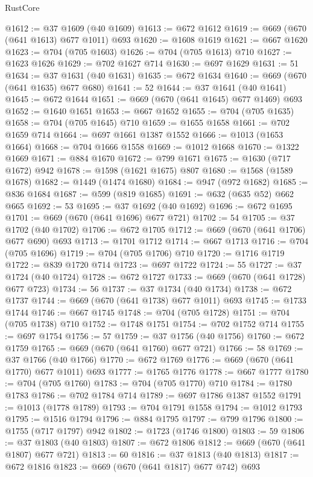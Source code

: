 \begin{lexlean}{RustCore}
\begin{coremodule}
@1612 := @37 @1609 (@40 @1609)
@1613 := @672 @1612
@1619 := @669 (@670 (@641 @1613) @677 @1011) @693
@1620 := @1608 @1619
@1621 := @667 @1620
@1623 := @704 (@705 @1603)
@1626 := @704 (@705 @1613) @710
@1627 := @1623 @1626
@1629 := @702 @1627 @714
@1630 := @697 @1629
@1631 := 51
@1634 := @37 @1631 (@40 @1631)
@1635 := @672 @1634
@1640 := @669 (@670 (@641 @1635) @677 @680)
@1641 := 52
@1644 := @37 @1641 (@40 @1641)
@1645 := @672 @1644
@1651 := @669 (@670 (@641 @1645) @677 @1469) @693
@1652 := @1640 @1651
@1653 := @667 @1652
@1655 := @704 (@705 @1635)
@1658 := @704 (@705 @1645) @710
@1659 := @1655 @1658
@1661 := @702 @1659 @714
@1664 := @697 @1661 @1387 @1552
@1666 := @1013 (@1653 @1664)
@1668 := @704 @1666 @1558
@1669 := @1012 @1668
@1670 := @1322 @1669
@1671 := @884 @1670
@1672 := @799 @1671
@1675 := @1630 (@717 @1672) @942
@1678 := @1598 (@1621 @1675) @807
@1680 := @1568 (@1589 @1678)
@1682 := @1449 (@1474 @1680)
@1684 := @947 (@972 @1682)
@1685 := @836 @1684
@1687 := @599 (@819 @1685)
@1691 := @632 (@635 @52) @662 @665
@1692 := 53
@1695 := @37 @1692 (@40 @1692)
@1696 := @672 @1695
@1701 := @669 (@670 (@641 @1696) @677 @721)
@1702 := 54
@1705 := @37 @1702 (@40 @1702)
@1706 := @672 @1705
@1712 := @669 (@670 (@641 @1706) @677 @690) @693
@1713 := @1701 @1712
@1714 := @667 @1713
@1716 := @704 (@705 @1696)
@1719 := @704 (@705 @1706) @710
@1720 := @1716 @1719
@1722 := @839 @1720 @714
@1723 := @697 @1722
@1724 := 55
@1727 := @37 @1724 (@40 @1724)
@1728 := @672 @1727
@1733 := @669 (@670 (@641 @1728) @677 @723)
@1734 := 56
@1737 := @37 @1734 (@40 @1734)
@1738 := @672 @1737
@1744 := @669 (@670 (@641 @1738) @677 @1011) @693
@1745 := @1733 @1744
@1746 := @667 @1745
@1748 := @704 (@705 @1728)
@1751 := @704 (@705 @1738) @710
@1752 := @1748 @1751
@1754 := @702 @1752 @714
@1755 := @697 @1754
@1756 := 57
@1759 := @37 @1756 (@40 @1756)
@1760 := @672 @1759
@1765 := @669 (@670 (@641 @1760) @677 @721)
@1766 := 58
@1769 := @37 @1766 (@40 @1766)
@1770 := @672 @1769
@1776 := @669 (@670 (@641 @1770) @677 @1011) @693
@1777 := @1765 @1776
@1778 := @667 @1777
@1780 := @704 (@705 @1760)
@1783 := @704 (@705 @1770) @710
@1784 := @1780 @1783
@1786 := @702 @1784 @714
@1789 := @697 @1786 @1387 @1552
@1791 := @1013 (@1778 @1789)
@1793 := @704 @1791 @1558
@1794 := @1012 @1793
@1795 := @1516 @1794
@1796 := @884 @1795
@1797 := @799 @1796
@1800 := @1755 (@717 @1797) @942
@1802 := @1723 (@1746 @1800)
@1803 := 59
@1806 := @37 @1803 (@40 @1803)
@1807 := @672 @1806
@1812 := @669 (@670 (@641 @1807) @677 @721)
@1813 := 60
@1816 := @37 @1813 (@40 @1813)
@1817 := @672 @1816
@1823 := @669 (@670 (@641 @1817) @677 @742) @693

\end{coremodule}
\end{lexlean}
